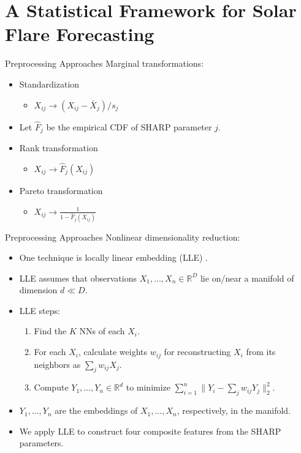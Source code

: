 \documentclass{beamer}
\def\R{\mathbb R}
\begin{document}
\section{A Statistical Framework for Solar Flare Forecasting}
\label{sect:forecast_framework}

\begin{frame}{Preprocessing Approaches}
    Marginal transformations:
    \begin{itemize}
        \item Standardization
        \begin{itemize}
            \item $X_{i j} \rightarrow (X_{i j} - \bar{X}_j) / s_j$
        \end{itemize}
        \item Let $\hat{F}_j$ be the empirical CDF of SHARP parameter $j$.
        \item Rank transformation
        \begin{itemize}
            \item $X_{i j} \rightarrow \hat{F}_j(X_{i j})$
        \end{itemize}
        \item Pareto transformation
        \begin{itemize}
            \item $X_{i j} \rightarrow \frac{1}{1 - \hat{F}_j(X_{i j})}$
        \end{itemize}
    \end{itemize}
\end{frame}

\begin{frame}{Preprocessing Approaches}
    Nonlinear dimensionality reduction:
    \begin{itemize}
        \item One technique is locally linear embedding (LLE) \cite{roweis2000nonl}.
        \item LLE assumes that observations $X_1, \ldots, X_n \in \R^D$ lie on/near a manifold of dimension $d \ll D$.
        \item LLE steps:
        \begin{enumerate}
            \item Find the $K$ NNs of each $X_i$.
            \item For each $X_i$, calculate weights $w_{i j}$ for reconstructing $X_i$ from its neighbors as $\sum_j w_{i j}X_j$.
            \item Compute $Y_1, \ldots, Y_n \in \R^d$ to minimize $\sum_{i = 1}^n \|Y_i - \sum_j w_{i j}Y_j\|_2^2$.
        \end{enumerate}
        \item $Y_1, \ldots, Y_n$ are the embeddings of $X_1, \ldots, X_n$, respectively, in the manifold.
        \item We apply LLE to construct four composite features from the SHARP parameters.
    \end{itemize}
\end{frame}
\end{document}
